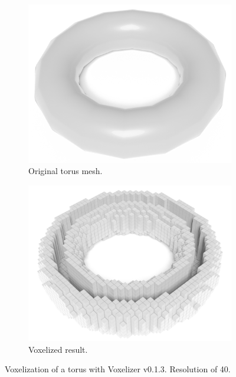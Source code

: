 \begin{figure}[h]
    \centering
    \begin{subfigure}[b]{0.49\textwidth}
        \centering
        \includegraphics[width=\textwidth]{sections/theory/figures/torus.png}
        \caption{Original torus mesh.}
        \label{fig:original-torus}
    \end{subfigure}
    \hfill
    \begin{subfigure}[b]{0.49\textwidth}
        \centering
        \includegraphics[width=\textwidth]{sections/theory/figures/voxelizer-v013-torus-40.png}
        \caption{Voxelized result.}
        \label{fig:voxelizer-v0.1.3-torus}
    \end{subfigure}
    \caption{Voxelization of a torus with Voxelizer v0.1.3. Resolution of 40.}
    \label{fig:voxelizer-v0.1.3-torus}
\end{figure}

